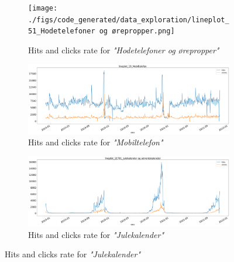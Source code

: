 \begin{figure}[h!]
  \centering
  \caption{Category plots of hits and click rate from 2019-2021}
  \label{fig:lineplot1}
  \begin{subfigure}[b]{\textwidth}
    \texttt{[image: ./figs/code\_generated/data\_exploration/lineplot\_51\_Hodetelefoner og ørepropper.png]}
    \hfill
    \caption{Hits and clicks rate for \textit{"Hodetelefoner og ørepropper"}}
    \label{fig:lineplot-Hodetelefoner}
  \end{subfigure}

  \begin{subfigure}[b]{\textwidth}
    \includegraphics[width=\textwidth]{./figs/code_generated/data_exploration/lineplot_19_Mobiltelefon.png}
    \hfill
    \caption{Hits and clicks rate for \textit{"Mobiltelefon"}}
    \label{fig:lineplot-Mobiltelefon}
  \end{subfigure}

  \begin{subfigure}[b]{\textwidth}
    \includegraphics[width=\textwidth]{./figs/code_generated/data_exploration/lineplot_11781_Julekalender og adventskalender.png}
    \hfill
    \caption{Hits and clicks rate for \textit{"Julekalender"}}
    \label{fig:lineplot-Julekalender}
  \end{subfigure}
\end{figure}

